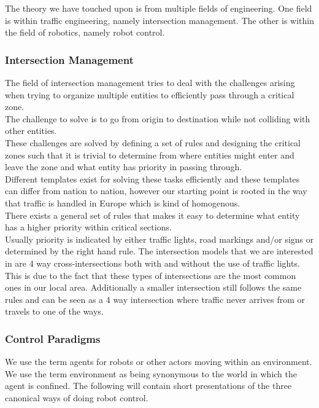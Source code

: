 The theory we have touched upon is from multiple fields of engineering. One field is within traffic engineering, namely intersection management. The other is within the field of robotics, namely robot control.

\subsubsection{Intersection Management}
The field of intersection management tries to deal with the challenges arising when trying to organize multiple entities to efficiently pass through a critical zone.\\
The challenge to solve is to go from origin to destination while not colliding with other entities.\\

These challenges are solved by defining a set of rules and designing the critical zones such that it is trivial to determine from where entities might enter and leave the zone and what entity has priority in passing through.\\
Different templates exist for solving these tasks efficiently and these templates can differ from nation to nation, however our starting point is rooted in the way that traffic is handled in Europe which is kind of homogenous.\\
There exists a general set of rules that makes it easy to determine what entity has a higher priority within critical sections.\\
Usually priority is indicated by either traffic lights, road markings and/or signs or determined by the right hand rule.
The intersection models that we are interested in are 4 way cross-intersections both with and without the use of traffic lights.
This is due to the fact that these types of intersections are the most common ones in our local area. Additionally a smaller intersection still follows the same rules and can be seen as a 4 way intersection where traffic never arrives from or travels to one of the ways.

\subsubsection{Control Paradigms}

We use the term agents for robots or other actors moving within an environment.\\
We use the term environment as being synonymous to the world in which the agent is confined.
The following will contain short presentations of the three canonical ways of doing robot control.

